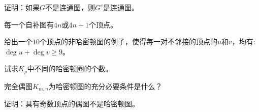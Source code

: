 \documentclass{article}
\begin{document}
\begin{CJK}{UTF8}{gbsn}
  \begin{Exercise}
    证明：如果$G$不是连通图，则$G^c$是连通图。
  \end{Exercise}

  \begin{Exercise}
    每一个自补图有$4n$或$4n+1$个顶点。
  \end{Exercise}
  \begin{Exercise}
    给出一个$10$个顶点的非哈密顿图的例子，使得每一对不邻接的顶点的$u$和$v$，均有:$\deg u + \deg v \geq 9$。
  \end{Exercise}
  \begin{Exercise}
    试求$K_p$中不同的哈密顿圈的个数。
  \end{Exercise}

  \begin{Exercise}
    完全偶图$K_{m,n}$为哈密顿图的充分必要条件是什么？
  \end{Exercise}

  \begin{Exercise}
    证明：具有奇数顶点的偶图不是哈密顿图。
  \end{Exercise}
  
\end{CJK}
\end{document}
